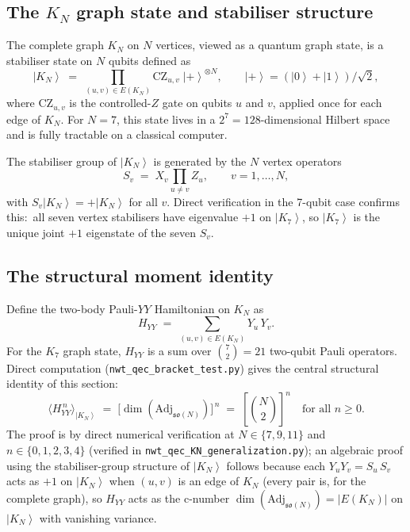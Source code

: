 \documentclass[11pt]{article}
\newcommand{\so}{\mathfrak{so}}
\newcommand{\Adj}{\mathrm{Adj}}
\newcommand{\ket}[1]{\left|#1\right\rangle}
\begin{document}
\subsection{The $K_N$ graph state and stabiliser structure}
\label{sec:qec-graph-state}

The complete graph $K_N$ on $N$ vertices, viewed as a quantum graph
state, is a stabiliser state on $N$ qubits defined as
\begin{equation}
  \ket{K_N}
  \;=\;
  \prod_{(u,v)\in E(K_N)}\!\!\!\!\!\! \mathrm{CZ}_{u,v}\;
  \ket{+}^{\otimes N},
  \qquad
  \ket{+} = (\ket{0} + \ket{1})/\sqrt{2},
\end{equation}
where $\mathrm{CZ}_{u,v}$ is the controlled-$Z$ gate on qubits
$u$ and $v$, applied once for each edge of $K_N$.  For $N = 7$, this
state lives in a $2^7 = 128$-dimensional Hilbert space and is fully
tractable on a classical computer.

The stabiliser group of $\ket{K_N}$ is generated by the $N$ vertex
operators
\begin{equation}
  S_v
  \;=\;
  X_v \prod_{u \neq v}\! Z_u,
  \qquad v = 1,\ldots, N,
\end{equation}
with $S_v\ket{K_N} = +\ket{K_N}$ for all $v$.  Direct verification
in the 7-qubit case confirms this:\ all seven vertex stabilisers
have eigenvalue $+1$ on $\ket{K_7}$, so $\ket{K_7}$ is the unique
joint $+1$ eigenstate of the seven $S_v$.

\subsection{The structural moment identity}
\label{sec:qec-moments}

Define the two-body Pauli-$YY$ Hamiltonian on $K_N$ as
\begin{equation}
  H_{YY} \;=\; \sum_{(u,v)\in E(K_N)} Y_u\, Y_v.
  \label{eq:H-YY-def}
\end{equation}
For the $K_7$ graph state, $H_{YY}$ is a sum over $\binom{7}{2} = 21$
two-qubit Pauli operators.  Direct computation
(\texttt{nwt\_qec\_bracket\_test.py}) gives the central structural
identity of this section:
\begin{equation}
  \boxed{\quad
    \langle H_{YY}^{\,n} \rangle_{\ket{K_N}}
    \;=\;
    \bigl[\dim(\Adj_{\so(N)})\bigr]^{\,n}
    \;=\; \left[\binom{N}{2}\right]^{n}
    \quad
    \text{for all } n \geq 0.
  \quad}
  \label{eq:moment-identity}
\end{equation}
The proof is by direct numerical verification at $N \in \{7, 9, 11\}$
and $n \in \{0, 1, 2, 3, 4\}$ (verified in
\texttt{nwt\_qec\_KN\_generalization.py}); an algebraic proof
using the stabiliser-group structure of $\ket{K_N}$ follows because
each $Y_u Y_v = S_u\, S_v$ acts as $+1$ on $\ket{K_N}$ when $(u,v)$
is an edge of $K_N$ (every pair is, for the complete graph), so
$H_{YY}$ acts as the c-number $\dim(\Adj_{\so(N)}) = |E(K_N)|$ on
$\ket{K_N}$ with vanishing variance.
\end{document}
